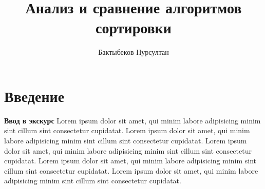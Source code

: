 

\title{Анализ и сравнение алгоритмов сортировки}
\author{Бактыбеков Нурсултан}





\newpage
\tableofcontents{}
\setcounter{page}{1}

\newpage
{}

\section*{Введение}

\textbf{Ввод в экскурс}
Lorem ipsum dolor sit amet, qui minim labore adipisicing minim sint cillum sint consectetur cupidatat.
Lorem ipsum dolor sit amet, qui minim labore adipisicing minim sint cillum sint consectetur cupidatat.
Lorem ipsum dolor sit amet, qui minim labore adipisicing minim sint cillum sint consectetur cupidatat.
Lorem ipsum dolor sit amet, qui minim labore adipisicing minim sint cillum sint consectetur cupidatat.
Lorem ipsum dolor sit amet, qui minim labore adipisicing minim sint cillum sint consectetur cupidatat.


